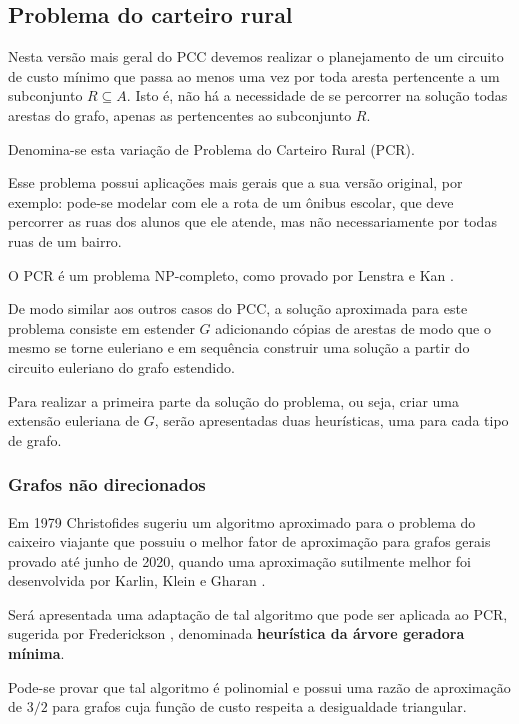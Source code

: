     \subsection{Problema do carteiro rural}
    
    Nesta versão mais geral do PCC devemos realizar o planejamento de um circuito de custo mínimo que passa ao menos uma vez por toda aresta pertencente a um subconjunto $R \subseteq A$. 
    Isto é, não há a necessidade de se percorrer na solução todas arestas do grafo, apenas as pertencentes ao subconjunto $R$.

    Denomina-se esta variação de Problema do Carteiro Rural (PCR).

    Esse problema possui aplicações mais gerais que a sua versão original, por exemplo: pode-se modelar com ele a rota de um ônibus escolar, que deve percorrer as ruas dos alunos que ele atende, mas não necessariamente por todas ruas de um bairro.

    O PCR é um problema NP-completo, como provado por Lenstra e Kan \cite{rural-np-complete}. 

    De modo similar aos outros casos do PCC, a solução aproximada para este problema consiste em estender $G$ adicionando cópias de arestas de modo que o mesmo se torne euleriano e em sequência construir uma solução a partir do circuito euleriano do grafo estendido.

    Para realizar a primeira parte da solução do problema, ou seja, criar uma extensão euleriana de $G$, serão apresentadas duas heurísticas, uma para cada tipo de grafo.

        \subsubsection{Grafos não direcionados}

        Em 1979 Christofides sugeriu um algoritmo aproximado para o problema do caixeiro viajante que possuiu o melhor fator de aproximação para grafos gerais provado \cite{wiki-christofides} até junho de 2020, quando uma aproximação sutilmente melhor foi desenvolvida por Karlin, Klein e Gharan \cite{klein-tsp}.

        Será apresentada uma adaptação de tal algoritmo que pode ser aplicada ao PCR, sugerida por Frederickson \cite{frederickson}, denominada \textbf{heurística da árvore geradora mínima}.

        Pode-se provar que tal algoritmo é polinomial e possui uma razão de aproximação de $3/2$ para grafos cuja função de custo respeita a desigualdade triangular. 

